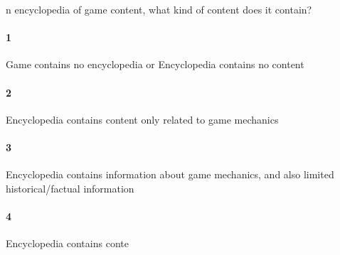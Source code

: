 n encyclopedia of game content, what kind of content does it contain?\paragraph{1}Game contains no encyclopedia or Encyclopedia contains no content\paragraph{2}Encyclopedia contains content only related to game mechanics\paragraph{3}Encyclopedia contains information about game mechanics, and also limited historical/factual information\paragraph{4}Encyclopedia contains conte